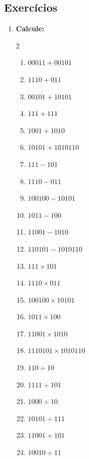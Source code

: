 \documentclass[12pt]{article}
\begin{document}
\subsection{Exercícios}
\begin{enumerate}
\item \textbf{Calcule:}
\begin{multicols}{2}
    \begin{enumerate}
        \item $00011 + 00101$
        \item $1110 + 011$
        \item $00101 + 10101$
        \item $111 + 111$
        \item $1001 + 1010$
        \item $10101 + 1010110$
        \item $111 - 101$
        \item $1110 - 011$
        \item $100100 - 10101$
        \item $1011 - 100$
        \item $11001 - 1010$
        \item $110101 - 1010110$
        \columnbreak
        \item $111 \times 101$
        \item $1110 \times 011$
        \item $100100 \times 10101$
        \item $1011 \times 100$
        \item $11001 \times 1010$
        \item $1110101 \times 1010110$
        \item $110 \div 10$
        \item $1111 \div 101$
        \item $1000 \div 10$
        \item $10101 \div 111$
        \item $11001 \div 101$
        \item $10010 \div 11$
    \end{enumerate}
\end{multicols}
\end{enumerate}

\newpage
\end{document}
